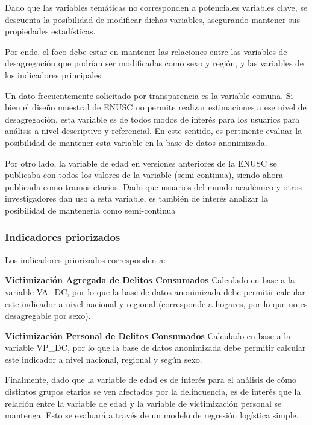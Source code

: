 \documentclass[
]{book}
\theoremstyle{definition}
\theoremstyle{definition}
\theoremstyle{definition}
\theoremstyle{definition}
\theoremstyle{remark}
\begin{document}
Dado que las variables temáticas no corresponden a potenciales variables clave, se descuenta la posibilidad de modificar dichas variables, asegurando mantener sus propiedades estadísticas.

Por ende, el foco debe estar en mantener las relaciones entre las variables de desagregación que podrían ser modificadas como sexo y región, y las variables de los indicadores principales.

Un dato frecuentemente solicitado por transparencia es la variable comuna. Si bien el diseño muestral de ENUSC no permite realizar estimaciones a ese nivel de desagregación, esta variable es de todos modos de interés para los usuarios para análisis a nivel descriptivo y referencial. En este sentido, es pertinente evaluar la posibilidad de mantener esta variable en la base de datos anonimizada.

Por otro lado, la variable de edad en versiones anteriores de la ENUSC se publicaba con todos los valores de la variable (semi-continua), siendo ahora publicada como tramos etarios. Dado que usuarios del mundo académico y otros investigadores dan uso a esta variable, es también de interés analizar la posibilidad de mantenerla como semi-continua

\hypertarget{indicadores-priorizados}{%
\subsubsection{Indicadores priorizados}\label{indicadores-priorizados}}

Los indicadores priorizados corresponden a:

\textbf{Victimización Agregada de Delitos Consumados}
Calculado en base a la variable VA\_DC, por lo que la base de datos anonimizada debe permitir calcular este indicador a nivel nacional y regional (corresponde a hogares, por lo que no es desagregable por sexo).

\textbf{Victimización Personal de Delitos Consumados}
Calculado en base a la variable VP\_DC, por lo que la base de datos anonimizada debe permitir calcular este indicador a nivel nacional, regional y según sexo.

Finalmente, dado que la variable de edad es de interés para el análisis de cómo distintos grupos etarios se ven afectados por la delincuencia, es de interés que la relación entre la variable de edad y la variable de victimización personal se mantenga. Esto se evaluará a través de un modelo de regresión logística simple.
\end{document}
